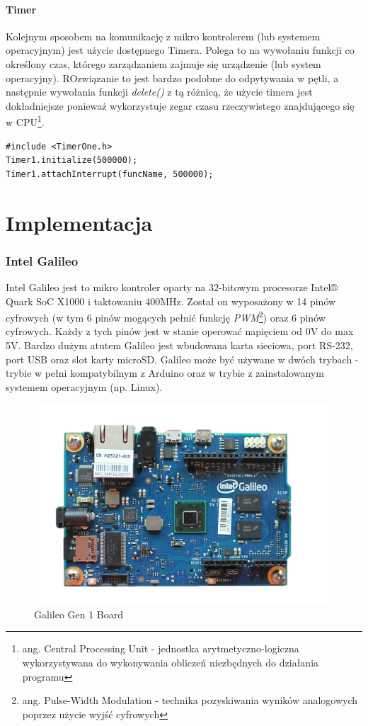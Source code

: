 \documentclass{xmgr}
\begin{document}
\subsubsection{Timer}
Kolejnym sposobem na komunikację z mikro kontrolerem (lub systemem operacyjnym) jest użycie dostępnego Timera. Polega to na wywołaniu funkcji co określony czas, którego zarządzaniem zajmuje się urządzenie (lub system operacyjny). ROzwiązanie to jest bardzo podobne do odpytywania w pętli, a następnie wywołania funkcji \emph{delete()} z tą różnicą, że użycie timera jest dokładniejsze ponieważ wykorzystuje zegar czasu rzeczywistego znajdującego się w CPU\footnote{ang. Central Processing Unit - jednostka arytmetyczno-logiczna wykorzystywana do wykonywania obliczeń niezbędnych do działania programu}.
\begin{lstlisting}[label=bot-dirs-alg,caption=Przykładowe użycie timer w środowisku Arduino]
#include <TimerOne.h>
Timer1.initialize(500000);
Timer1.attachInterrupt(funcName, 500000);
\end{lstlisting}


\chapter{Implementacja}
\subsection{Intel Galileo}
Intel Galileo jest  to mikro kontroler oparty na 32-bitowym procesorze Intel® Quark SoC X1000 i taktowaniu 400MHz. Został on wyposażony w 14 pinów cyfrowych (w tym 6 pinów mogących pełnić funkcję \emph{PWM}\footnote{ang. Pulse-Width Modulation - technika pozyskiwania wyników analogowych poprzez użycie wyjść cyfrowych}) oraz 6 pinów cyfrowych. Każdy z tych pinów jest w stanie operować napięciem od 0V do max 5V. Bardzo dużym atutem Galileo jest wbudowana karta sieciowa, port RS-232, port USB oraz slot karty microSD. Galileo może być używane w dwóch trybach - trybie w pełni kompatybilnym z Arduino oraz w trybie z zainstalowanym systemem operacyjnym (np. Linux).

\begin{figure}[!h]
    \centering
    \includegraphics[height=0.4\textwidth]{images/galileo.png}
    \caption{Galileo Gen 1 Board \label{Galileo Gen 1 Board}}
\end{figure}
\end{document}
